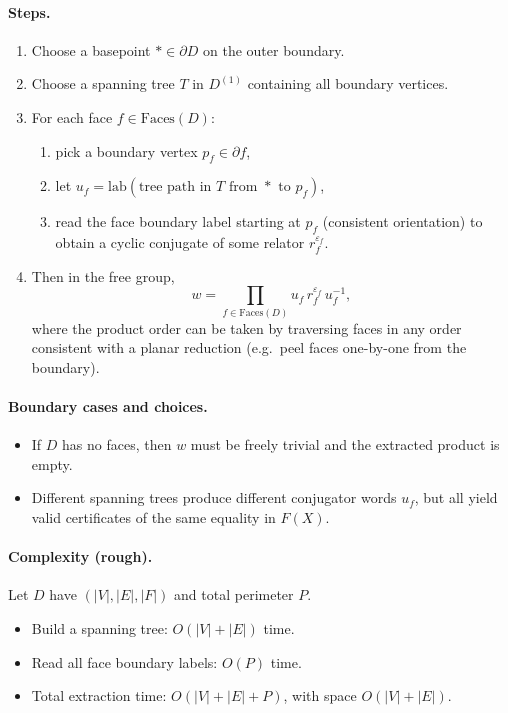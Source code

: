 \documentclass[11pt]{article}
\theoremstyle{definition}
\theoremstyle{plain}
\theoremstyle{remark}
\newcommand{\lab}{\mathrm{lab}}
\newcommand{\Faces}{\mathrm{Faces}}
\begin{document}
\paragraph{Steps.}
\begin{enumerate}[leftmargin=2.2em]
\item Choose a basepoint $*\in\partial D$ on the outer boundary.
\item Choose a spanning tree $T$ in $D^{(1)}$ containing all boundary vertices.
\item For each face $f\in \Faces(D)$:
\begin{enumerate}[leftmargin=2em]
\item pick a boundary vertex $p_f\in\partial f$,
\item let $u_f=\lab(\text{tree path in }T\text{ from }*\text{ to }p_f)$,
\item read the face boundary label starting at $p_f$ (consistent orientation) to obtain a cyclic conjugate of some relator $r_f^{\varepsilon_f}$.
\end{enumerate}
\item Then in the free group,
\[
w=\prod_{f\in \Faces(D)} u_f\, r_f^{\varepsilon_f}\, u_f^{-1},
\]
where the product order can be taken by traversing faces in any order consistent with a planar reduction (e.g.\ peel faces one-by-one from the boundary).
\end{enumerate}



\paragraph{Boundary cases and choices.}
\begin{itemize}[leftmargin=2em]
\item If $D$ has no faces, then $w$ must be freely trivial and the extracted product is empty.
\item Different spanning trees produce different conjugator words $u_f$, but all yield valid certificates of the same equality in $F(X)$.
\end{itemize}

\paragraph{Complexity (rough).}\cite{lyndonschupp1977}
Let $D$ have $(|V|,|E|,|F|)$ and total perimeter $P$.
\begin{itemize}[leftmargin=2em]
\item Build a spanning tree: $O(|V|+|E|)$ time.
\item Read all face boundary labels: $O(P)$ time.
\item Total extraction time: $O(|V|+|E|+P)$, with space $O(|V|+|E|)$.
\end{itemize}
\end{document}

